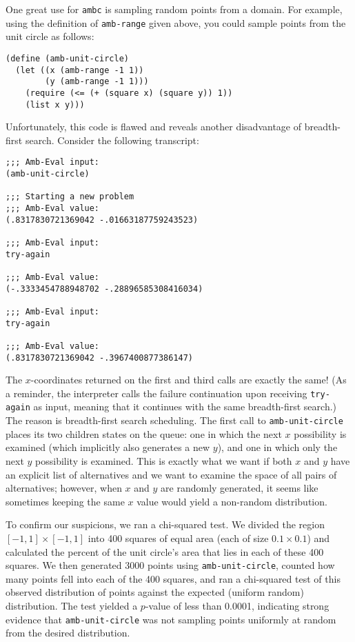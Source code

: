 \documentclass{article}
\begin{document}
One great use for \texttt{ambc} is sampling random points from a domain. For
example, using the definition of \texttt{amb-range} given above, you could
sample points from the unit circle as follows:
\begin{lstlisting}
(define (amb-unit-circle)
  (let ((x (amb-range -1 1))
        (y (amb-range -1 1)))
    (require (<= (+ (square x) (square y)) 1))
    (list x y)))
\end{lstlisting}

Unfortunately, this code is flawed and reveals another disadvantage of
breadth-first search. Consider the following transcript:
\begin{lstlisting}
;;; Amb-Eval input:
(amb-unit-circle)

;;; Starting a new problem
;;; Amb-Eval value:
(.8317830721369042 -.01663187759243523)

;;; Amb-Eval input:
try-again

;;; Amb-Eval value:
(-.3333454788948702 -.28896585308416034)

;;; Amb-Eval input:
try-again

;;; Amb-Eval value:
(.8317830721369042 -.3967400877386147)
\end{lstlisting}

The $x$-coordinates returned on the first and third calls are exactly the same!
(As a reminder, the interpreter calls the failure continuation upon receiving
\texttt{try-again} as input, meaning that it continues with the same
breadth-first search.) The reason is breadth-first search scheduling. The first
call to \texttt{amb-unit-circle} places its two children states on the queue:
one in which the next $x$ possibility is examined (which implicitly also
generates a new $y$), and one in which only the next $y$ possibility is
examined. This is exactly what we want if both $x$ and $y$ have an explicit
list of alternatives and we want to examine the space of all pairs of
alternatives; however, when $x$ and $y$ are randomly generated, it seems like
sometimes keeping the same $x$ value would yield a non-random distribution.

To confirm our suspicions, we ran a chi-squared test. We divided the region
$[-1,1]\times[-1,1]$ into 400 squares of equal area (each of size $0.1\times
0.1$) and calculated the percent of the unit circle's area that lies in each of
these 400 squares. We then generated 3000 points using
\texttt{amb-unit-circle}, counted how many points fell into each of the 400
squares, and ran a chi-squared test of this observed distribution of points
against the expected (uniform random) distribution. The test yielded a
$p$-value of less than 0.0001, indicating strong evidence that
\texttt{amb-unit-circle} was not sampling points uniformly at random from the
desired distribution.
\end{document}

